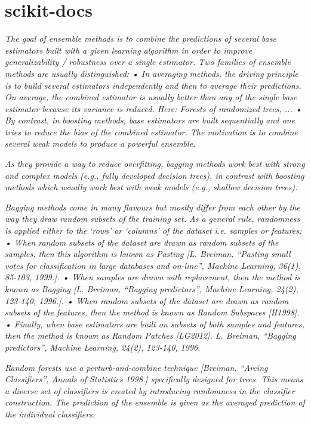 \section{scikit-docs}

\textit{The goal of ensemble methods is to combine the predictions of several base estimators built with a given learning algorithm in order to improve generalizability / robustness over a single estimator.
Two families of ensemble methods are usually distinguished:
• In averaging methods, the driving principle is to build several estimators independently and then to average their predictions. On average, the combined estimator is usually better than any of the single base estimator because its variance is reduced.
Here: Forests of randomized trees, ...
• By contrast, in boosting methods, base estimators are built sequentially and one tries to reduce the bias of the combined estimator. The motivation is to combine several weak models to produce a powerful ensemble.}

\textit{As they provide a way to reduce overfitting, bagging methods work best with strong and complex models (e.g., fully developed decision trees), in contrast with boosting methods which usually work best with weak models (e.g., shallow decision trees).}

\textit{Bagging methods come in many flavours but mostly differ from each other by the way they draw random subsets of the training set. As a general rule, randomness is applied either to the ‘rows’ or ‘columns’ of the dataset i.e. samples or features:    
• When random subsets of the dataset are drawn as random subsets of the samples, then this algorithm is known as Pasting [L. Breiman, “Pasting small votes for classification in large databases and on-line”, Machine Learning, 36(1), 85-103, 1999.].
• When samples are drawn with replacement, then the method is known as Bagging [L. Breiman, “Bagging predictors”, Machine Learning, 24(2), 123-140, 1996.].
• When random subsets of the dataset are drawn as random subsets of the features, then the method is known as Random Subspaces [H1998].
• Finally, when base estimators are built on subsets of both samples and features, then the method is known as
Random Patches [LG2012].
L. Breiman, “Bagging predictors”, Machine Learning, 24(2), 123-140, 1996.}

\textit{Random forests use a perturb-and-combine technique [Breiman, “Arcing Classifiers”, Annals of Statistics 1998.] specifically designed for trees. This means a diverse set of classifiers is created by introducing randomness in the classifier construction. The prediction of the ensemble is given as the averaged prediction of the individual classifiers.}

